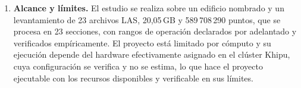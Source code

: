 \begin{enumerate}
\item \textbf{Alcance y límites.} El estudio se realiza sobre un edificio
nombrado y un levantamiento de 23 archivos LAS, 20{,}05\,GB y
589\,708\,290 puntos, que se procesa en 23 secciones, con
rangos de operación declarados por adelantado y verificados empíricamente. El
proyecto está limitado por cómputo y su ejecución depende del hardware
efectivamente asignado en el clúster Khipu, cuya configuración se verifica y no
se estima, lo que hace el proyecto ejecutable con los recursos disponibles y
verificable en sus límites.
\end{enumerate}
